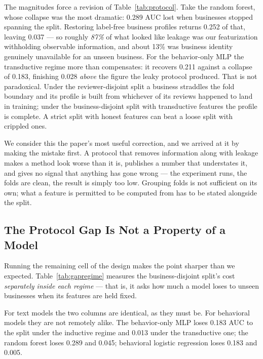 \documentclass[conference]{IEEEtran}
\begin{document}
The magnitudes force a revision of Table~\ref{tab:protocol}. Take the random
forest, whose collapse was the most dramatic: 0.289 AUC lost when businesses
stopped spanning the split. Restoring label-free business profiles returns 0.252
of that, leaving 0.037 --- so roughly \textit{87\%} of what looked like leakage
was our featurization withholding observable information, and about 13\% was
business identity genuinely unavailable for an unseen business. For the
behavior-only MLP the transductive regime more than compensates: it recovers
0.211 against a collapse of 0.183, finishing 0.028 \textit{above} the figure the
leaky protocol produced. That is not paradoxical. Under the reviewer-disjoint
split a business straddles the fold boundary and its profile is built from
whichever of its reviews happened to land in training; under the
business-disjoint split with transductive features the profile is complete. A
strict split with honest features can beat a loose split with crippled ones.

We consider this the paper's most useful correction, and we arrived at it by
making the mistake first. A protocol that removes information along with leakage
makes a method look worse than it is, publishes a number that understates it,
and gives no signal that anything has gone wrong --- the experiment runs, the
folds are clean, the result is simply too low. Grouping folds is not sufficient
on its own; what a feature is permitted to be computed from has to be stated
alongside the split.

\subsection{The Protocol Gap Is Not a Property of a Model}
\label{sec:gapregime}

Running the remaining cell of the design makes the point sharper than we
expected. Table~\ref{tab:gapregime} measures the business-disjoint split's cost
\textit{separately inside each regime} --- that is, it asks how much a model
loses to unseen businesses when its features are held fixed.



For text models the two columns are identical, as they must be. For behavioral
models they are not remotely alike. The behavior-only MLP loses 0.183 AUC to the
split under the inductive regime and 0.013 under the transductive one; the
random forest loses 0.289 and 0.045; behavioral logistic regression loses 0.183
and 0.005.
\end{document}
